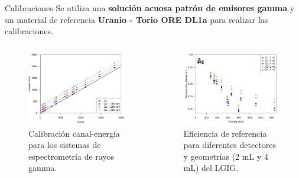 \documentclass[9pt]{beamer}
\begin{document}
\begin{frame}{Calibraciones}
	\justifying Se utiliza una \textbf{solución acuosa patrón de emisores gamma} y un material de referencia \textbf{Uranio - Torio ORE DL1a} para realizar las calibraciones.
	\begin{columns}
		\begin{column}{0.48\textwidth}
			\begin{figure}
			\centering
			\includegraphics[width=1\textwidth]{Imagenes/Calibraciones_Canal_Energia.pdf}
			\caption{\justifying Calibración canal-energía para los sistemas de espectrometría de rayos gamma.}\label{Fig-Cal-Canal-Energia}
			\end{figure}
		\end{column}
		\begin{column}{0.48\textwidth}  
			\begin{figure}
			\centering
			\includegraphics[width=1\textwidth]{Imagenes/Eficiencia_agua.pdf}
			\caption{\justifying Eficiencia de referencia para diferentes detectores y geometrías (2 mL y 4 mL) del LGIG.}\label{Fig-EficienciaAgua}
			\end{figure}
		\end{column}
	\end{columns}
\end{frame}
\end{document}
